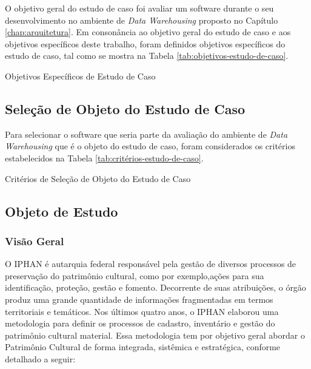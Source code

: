 O objetivo geral do estudo de caso foi avaliar um software durante o seu desenvolvimento no ambiente de \textit{Data Warehousing} proposto no Capítulo \ref{chap:arquitetura}. Em consonância ao objetivo geral do estudo de caso e aos objetivos específicos deste trabalho, foram definidos objetivos específicos do estudo de caso, tal como se mostra na Tabela \ref{tab:objetivos-estudo-de-caso}.

\begin{table}[H]
\begin{center}

\caption{Objetivos Específicos de Estudo de Caso}
\label{tab:objetivos-estudo-de-caso}
\end{center}
\end{table}
\FloatBarrier

\subsection{Seleção de Objeto do Estudo de Caso} 

Para selecionar o software que seria parte da avaliação do ambiente de \textit{Data Warehousing} que é o objeto do estudo de caso, foram considerados os critérios estabelecidos na Tabela \ref{tab:critérios-estudo-de-caso}. 


\begin{table}[H]
\begin{center}

\caption{Critérios de Seleção de Objeto do Estudo de Caso}
\label{tab:critérios-estudo-de-caso}
\end{center}
\end{table}
\FloatBarrier

\subsection{Objeto de Estudo}

\subsubsection{Visão Geral}

O IPHAN é autarquia federal responsável pela gestão de diversos processos de preservação do patrimônio cultural, como por exemplo,ações para sua identificação, proteção, gestão e fomento. Decorrente
de suas atribuições, o órgão produz uma grande quantidade de informações fragmentadas em termos territoriais e temáticos. Nos últimos quatro anos, o IPHAN elaborou uma metodologia
para definir os processos de cadastro, inventário e gestão do patrimônio cultural material. Essa metodologia tem por objetivo geral abordar o Patrimônio Cultural de forma integrada, sistêmica
e estratégica, conforme detalhado a seguir:

